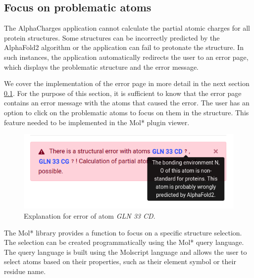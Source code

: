 \documentclass[
  digital,     %
  oneside,     %
  nosansbold,  %
  nocolorbold, %
  lof,         %
  lot,         %
]{fithesis4}
\begin{document}
\subsection{Focus on problematic atoms}

The AlphaCharges application cannot calculate the partial atomic charges for all protein structures. Some structures can be incorrectly predicted by the AlphaFold2 algorithm or the application can fail to protonate the structure.
\cite{jumper2021alphafold} In such instances, the application automatically redirects the user to an error page, which displays the problematic structure and the error message.

We cover the implementation of the error page in more detail in the next section \ref{}. For the purpose of this section, it is sufficient to know that the error page contains an error message with the atoms that caused the error. The user has an option to click on the problematic atoms to focus on them in the structure. This feature needed to be implemented in the Mol* plugin viewer.


\begin{figure}[htbp]
  \begin{center}
    \includegraphics[width=\textwidth]{figures/wrong_structure_text.png}
  \end{center}
  \caption{Explanation for error of atom \textit{GLN 33 CD}.}
  \label{fig:wrong_structure_text}
\end{figure}

The Mol* library provides a function to focus on a specific structure selection. The selection can be created programmatically using the Mol* query language. The query language is built using the Molscript language \cite{kraulis1991molscript} and allows the user to select atoms based on their properties, such as their element symbol or their residue name.
\end{document}
